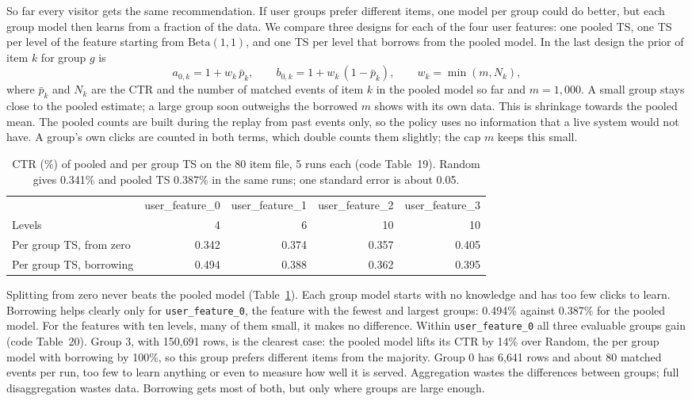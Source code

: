 \documentclass[11pt]{article}
\begin{document}
So far every visitor gets the same recommendation. If user groups prefer
different items, one model per group could do better, but each group model
then learns from a fraction of the data. We compare three designs for each of
the four user features: one pooled TS, one TS per level of the feature
starting from $\text{Beta}(1,1)$, and one TS per level that borrows from the
pooled model. In the last design the prior of item $k$ for group $g$ is
%
\begin{equation}
  a_{0,k} = 1 + w_k\,\bar p_k, \qquad b_{0,k} = 1 + w_k\,(1-\bar p_k),
  \qquad w_k = \min(m, N_k),
  \label{eq:borrow}
\end{equation}
%
where $\bar p_k$ and $N_k$ are the CTR and the number of matched events of
item $k$ in the pooled model so far and $m=1{,}000$. A small group stays close
to the pooled estimate; a large group soon outweighs the borrowed $m$ shows
with its own data. This is shrinkage towards the pooled mean. The pooled
counts are built during the replay from past events only, so the policy uses
no information that a live system would not have. A group's own clicks are
counted in both terms, which double counts them slightly; the cap $m$ keeps
this small.

\begin{table}[H]
  \centering
  \caption{CTR (\%) of pooled and per group TS on the 80 item file, 5 runs
    each (code Table~19). Random gives 0.341\% and pooled TS 0.387\% in the
    same runs; one standard error is about 0.05.}
  \label{tab:d}
  \small
  \begin{tabular}{lrrrr}
    \toprule
    & user\_feature\_0 & user\_feature\_1 & user\_feature\_2 & user\_feature\_3 \\
    Levels & 4 & 6 & 10 & 10 \\
    \midrule
    Per group TS, from zero    & 0.342 & 0.374 & 0.357 & 0.405 \\
    Per group TS, borrowing    & 0.494 & 0.388 & 0.362 & 0.395 \\
    \bottomrule
  \end{tabular}
\end{table}

Splitting from zero never beats the pooled model (Table~\ref{tab:d}). Each
group model starts with no knowledge and has too few clicks to learn.
Borrowing helps clearly only for \texttt{user\_feature\_0}, the feature with
the fewest and largest groups: 0.494\% against 0.387\% for the pooled model.
For the features with ten levels, many of them small, it makes no
difference. Within \texttt{user\_feature\_0} all three evaluable groups gain
(code Table~20). Group 3, with 150{,}691 rows, is the clearest case: the
pooled model lifts its CTR by 14\% over Random, the per group model with
borrowing by 100\%, so this group prefers different items from the majority.
Group 0 has 6{,}641 rows and about 80 matched events per run, too few to
learn anything or even to measure how well it is served. Aggregation wastes
the differences between groups; full disaggregation wastes data. Borrowing
gets most of both, but only where groups are large enough.
\end{document}
